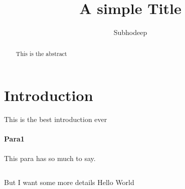 \documentclass{article}[12pt]
\begin{document}
\title{A simple Title}
\author{Subhodeep}

\maketitle

\begin{abstract}
This is the abstract
\end{abstract}

\section{Introduction}
This is the best introduction ever

\paragraph{Para1} This para has so much to say. 

\subsection{} But I want some more details
Hello World
\end{document}
